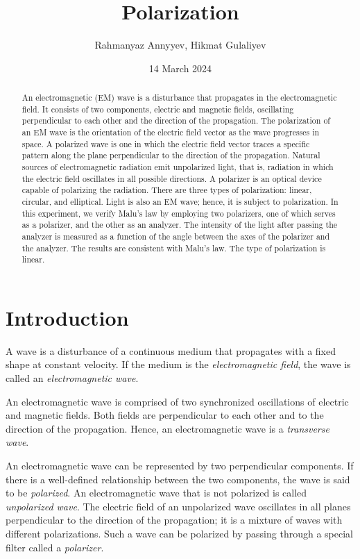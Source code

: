 \documentclass[10pt]{article}
\title{Polarization}
\author{Rahmanyaz Annyyev, Hikmat Gulaliyev}
\date{14 March 2024}
\begin{document}
\maketitle

\begin{abstract}

An electromagnetic (EM) wave is a disturbance that propagates in the electromagnetic field. It consists of two components, electric and magnetic fields, oscillating perpendicular to each other and the direction of the propagation. The polarization of an EM wave is the orientation of the electric field vector as the wave progresses in space. A polarized wave is one in which the electric field vector traces a specific pattern along the plane perpendicular to the direction of the propagation. Natural sources of electromagnetic radiation emit unpolarized light, that is, radiation in which the electric field oscillates in all possible directions. A polarizer is an optical device capable of polarizing the radiation. There are three types of polarization: linear, circular, and elliptical. Light is also an EM wave; hence, it is subject to polarization. In this experiment, we verify Malu's law by employing two polarizers, one of which serves as a polarizer, and the other as an analyzer. The intensity of the light after passing the analyzer is measured as a function of the angle between the axes of the polarizer and the analyzer. The results are consistent with Malu's law. The type of polarization is linear.

\end{abstract}

\section{Introduction}

A wave is a disturbance of a continuous medium that propagates with a fixed shape at constant velocity. If the medium is the \textit{electromagnetic field}, the wave is called an \textit{electromagnetic wave}. 

An electromagnetic wave is comprised of two synchronized oscillations of electric and magnetic fields. Both fields are perpendicular to each other and to the direction of the propagation. Hence, an electromagnetic wave is a \textit{transverse wave}.

An electromagnetic wave can be represented by two perpendicular components. If there is a well-defined relationship between the two components, the wave is said to be \textit{polarized}. An electromagnetic wave that is not polarized is called \textit{unpolarized wave}. The electric field of an unpolarized wave oscillates in all planes perpendicular to the direction of the propagation; it is a mixture of waves with different polarizations. Such a wave can be polarized by passing through a special filter called a \textit{polarizer}.
\end{document}
